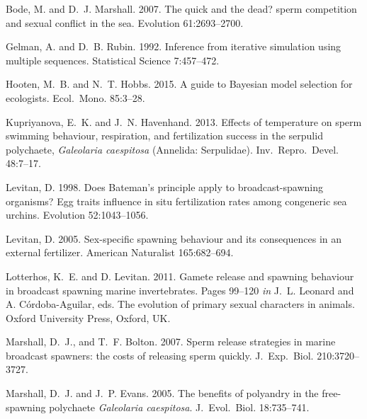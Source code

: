\documentclass{article}
\begin{document}
\begin{thebibliography}{}

Bode, M. and D.~J. Marshall. 2007.
\newblock The quick and the dead? sperm competition and sexual conflict in the sea.
\newblock Evolution 61:2693--2700.

Gelman, A. and D.~B. Rubin. 1992.
\newblock Inference from iterative simulation using multiple sequences.
\newblock Statistical Science 7:457--472.

Hooten, M.~B. and N.~T. Hobbs. 2015.
\newblock A guide to Bayesian model selection for ecologists.
\newblock Ecol.~Mono. 85:3--28.

Kupriyanova, E.~K. and J.~N. Havenhand. 2013.
\newblock Effects of temperature on sperm swimming behaviour, respiration, and fertilization success in the serpulid polychaete, \textit{Galeolaria caespitosa} (Annelida: Serpulidae).
\newblock Inv.~Repro.~Devel. 48:7--17.

Levitan, D. 1998.
\newblock Does Bateman's principle apply to broadcast-spawning organisms? Egg traits influence in situ fertilization rates among congeneric sea urchins.
\newblock Evolution 52:1043--1056.

Levitan, D. 2005.
\newblock Sex-specific spawning behaviour and its consequences in an external fertilizer.
\newblock American Naturalist 165:682--694.

Lotterhos, K.~E. and D. Levitan. 2011.
\newblock Gamete release and spawning behaviour in broadcast spawning marine invertebrates.
\newblock Pages 99--120 \emph{in} J.~L. Leonard and A. C\'{o}rdoba-Aguilar, eds. The evolution of primary sexual characters in animals. Oxford University Press, Oxford, UK.

Marshall, D.~J., and T.~F. Bolton. 2007.
\newblock Sperm release strategies in marine broadcast spawners: the costs of releasing sperm quickly.
\newblock J.~Exp.~Biol. 210:3720--3727.

Marshall, D.~J. and J.~P. Evans. 2005.
\newblock The benefits of polyandry in the free-spawning polychaete \textit{Galeolaria caespitosa}.
\newblock J.~Evol.~Biol. 18:735--741.


\end{thebibliography}
\end{document}
